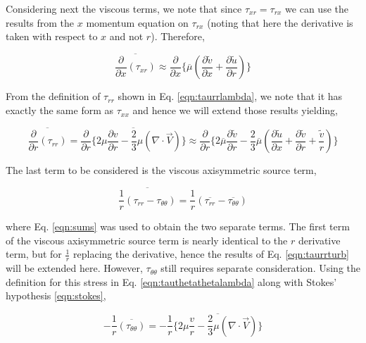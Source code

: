 	Considering next the viscous terms, we note that since $\tau_{xr} = \tau_{rx}$ we can use the 
results from the $x$ momentum equation on $\tau_{rx}$ (noting that here the derivative is taken with 
respect to $x$ and not $r$).  Therefore,

\begin{displaymath}
	\overline{\frac{\partial}{\partial x}(\tau_{xr})} \approx \frac{\partial}{\partial x}\Big\{\overline{\mu}
	(\frac{\partial \tilde{v}}{\partial x} + \frac{\partial \tilde{u}}{\partial r})\Big\}	
\end{displaymath}

	From the definition of $\tau_{rr}$ shown in Eq. \ref{eqn:taurrlambda},
we note that it has exactly the same form as $\tau_{xx}$ and hence we will extend those results yielding,

\begin{equation}
	\overline{\frac{\partial}{\partial r}(\tau_{rr})} = \overline{\frac{\partial}{\partial r}\Big\{
	2\mu \frac{\partial v}{\partial r} - \frac{2}{3}\mu (\nabla \cdot \vec{V}) \Big\}} 
	 \approx \frac{\partial}{\partial r}\Big\{
	2\overline{\mu}\frac{\partial \tilde{v}}{\partial r} - \frac{2}{3}\overline{\mu} (\frac{\partial \tilde{u}}
	{\partial x} + \frac{\partial \tilde{v}}{\partial r} + \frac{\tilde{v}}{r}) 
	\Big\}
\label{eqn:taurrturb}
\end{equation}

	The last term to be considered is the viscous axisymmetric source term, 

\begin{displaymath}
	\overline{\frac{1}{r}(\tau_{rr} - \tau_{\theta \theta})} = \frac{1}{r}(\overline{\tau_{rr}} - 
	\overline{\tau_{\theta \theta}})
\end{displaymath}

	where Eq. \ref{eqn:sums} was used to obtain the two separate terms.  The first term of the viscous 
axisymmetric source term is nearly 
identical to the $r$ derivative term, but for $\frac{1}{r}$ replacing the derivative, hence the results of
Eq. \ref{eqn:taurrturb} will be extended here.  However, $\tau_{\theta \theta}$ still requires separate
consideration.  Using the definition for this stress in Eq. \ref{eqn:tauthetathetalambda} along with Stokes'
hypothesis \ref{eqn:stokes},

\begin{displaymath}
	-\frac{1}{r}\overline{(\tau_{\theta \theta})} = -\frac{1}{r}\Big\{\overline{2 \mu \frac{v}{r} -\frac{2}{3}\mu
	(\nabla \cdot \vec{V})}\Big\}  
\end{displaymath}

